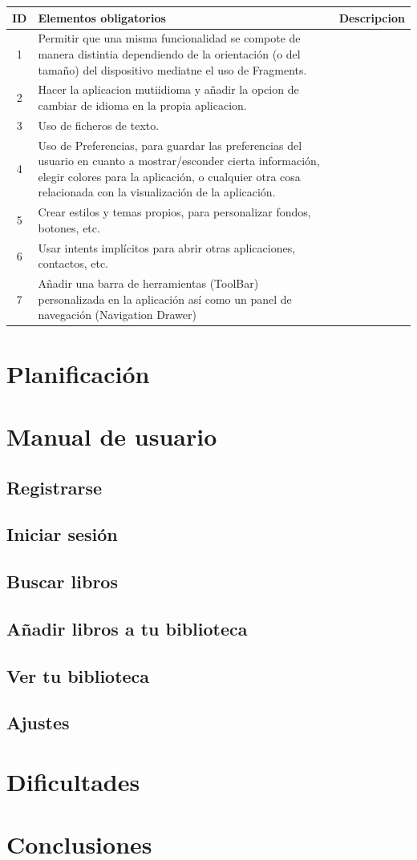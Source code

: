 \documentclass[a4paper,12pt]{report}
\begin{document}
    \begin{longtable}{|c|p{}|p{}|}
      \hline
      \textbf{ID} & \textbf{Elementos obligatorios} & \textbf{Descripcion} \\ \hline
      1 & Permitir que una misma funcionalidad se compote de manera distintia dependiendo de la orientación (o del tamaño) del dispositivo mediatne el uso de Fragments. & \\ \hline
      2 & Hacer la aplicacion mutiidioma y añadir la opcion de cambiar de idioma en la propia aplicacion. & \\ \hline
      3 & Uso de ficheros de texto. & \\ \hline
      4 & Uso de Preferencias, para guardar las preferencias del usuario en cuanto a mostrar/esconder cierta información, elegir colores para la aplicación, o cualquier otra cosa relacionada con la visualización de la aplicación. & \\ \hline
      5 & Crear estilos y temas propios, para personalizar fondos, botones, etc. & \\ \hline 
      6 & Usar intents implícitos para abrir otras aplicaciones, contactos, etc. & \\ \hline
      7 & Añadir una barra de herramientas (ToolBar) personalizada en la aplicación así como un panel de navegación (Navigation Drawer) & \\ \hline
    \end{longtable}
  \chapter{Planificación}
  \chapter{Manual de usuario}
    \section{Registrarse}
    \section{Iniciar sesión}
    \section{Buscar libros}
    \section{Añadir libros a tu biblioteca}
    \section{Ver tu biblioteca}
    \section{Ajustes}
  \chapter{Dificultades}
  \chapter{Conclusiones}
\end{document}
